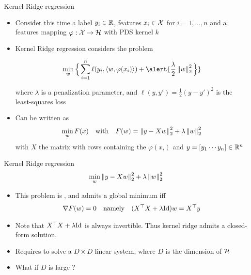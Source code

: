 \documentclass[xcolor={usenames,dvipsnames}]{beamer}
\begin{document}
\begin{frame}{Kernel Ridge regression}

  \begin{itemize}
    \item Consider this time a  label $y_i \in \mathbb{R}$, features $x_i \in {\mathcal{X}}$ for $i=1, \ldots, n$ and a features mapping $\varphi : {\mathcal{X}} \rightarrow \mathcal{H}$ with PDS 
    kernel $k$
    \pause
    \item Kernel \alert{Ridge} regression considers the problem
    \begin{block}{}
    \begin{equation*}
      \min_{w} \Big\{ \sum_{i=1}^n \ell(y_i, \inr{w, \varphi(x_i)}) + \alert{\frac{\lambda}{2} 
      \norm{w}_2^2 \Big\} }
    \end{equation*}
    \end{block}
    where $\lambda$ is a penalization parameter, and $\ell(y, y') = \frac 12 (y - y')^2$ is the least-squares loss
    \pause 
    \item Can be written as
      \begin{equation*}
        \min_{w} F(x) \quad \text{with} \quad F(w) = \left\| y - X w \right\|_2^2 + \lambda \left\| w \right\|_2^2
      \end{equation*}
      with $X$ the matrix with rows containing the $\varphi(x_i)$ and $y = [y_1 \cdots y_n] \in \mathbb{R}^n$
  \end{itemize}
  
\end{frame}
  


\begin{frame}{Kernel Ridge regression}
$$
\min_{w} \left\| y - X w \right\|_2^2 + \lambda \left\| w \right\|_2^2
$$
\pause
  \begin{itemize}
    \item   This problem is , and admits a global minimum iff
    \pause 
  \begin{equation*}
    \nabla F(w) = 0 \quad \text{namely} \quad (X^\top X + \lambda \mathrm{Id}) 
    w = X^\top y
  \end{equation*}
  \pause 
  \item Note that $X^\top X + \lambda \mathrm{Id}$ is always invertible. Thus kernel ridge  admits a closed-form solution.
  \pause 
  \item Requires to solve a $D \times D$ linear system, where $D$ is the dimension 
  of $\mathcal{H}$
  \item \alert{What if $D$ is large ?}
  \end{itemize}
  \end{frame}
  
\end{document}

